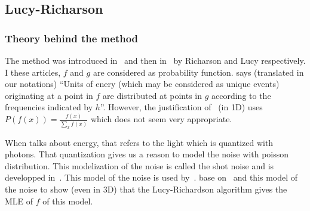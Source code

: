 \subsection{Lucy-Richarson}
\label{subsec:Lucy}
\subsubsection{Theory behind the method}
The method was introduced in~\cite{richardson1972bayesian} and
then in~\cite{lucy1974iterative} by Richarson and Lucy respectively.
I these articles, $f$ and $g$ are considered as probability function.
\cite{richardson1972bayesian} says (translated in our notations)
``Units of enery (which may be considered as unique events)
originating at a point in $f$ are distributed at points in $g$
according to the frequencies indicated by $h$''.
However, the justification of~\cite{richardson1972bayesian} (in 1D) uses
$P(f(x)) = \frac{f(x)}{\sum_x f(x)}$ which does not seem
very appropriate.

When \cite{richardson1972bayesian} talks about energy,
that refers to the light which is quantized with photons.
That quantization gives us a reason to model the noise with
poisson distribution.
This modelization of the noise is called the shot noise and
is developped in~\cite{blanter2000shot}.
This model of the noise is used by~\cite{hebert1989generalized}.
\cite{temerinac2010tile} base on~\cite{hebert1989generalized}
and this model of the noise to show (even in 3D)
that the Lucy-Richardson algorithm gives the MLE of $f$ of this
model.

